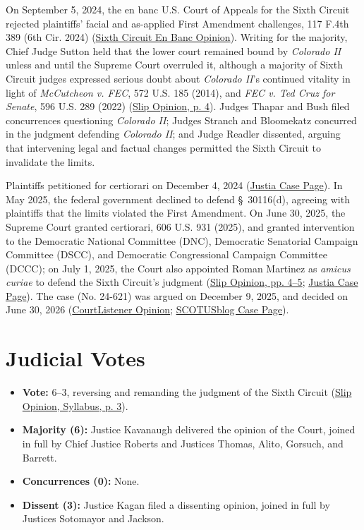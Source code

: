 \documentclass[12pt]{article}
\begin{document}
On September 5, 2024, the en banc U.S. Court of Appeals for the Sixth Circuit rejected plaintiffs' facial and as-applied First Amendment challenges, 117 F.4th 389 (6th Cir. 2024) (\href{https://law.justia.com/cases/federal/appellate-courts/ca6/24-3051/24-3051-2024-09-05.html}{Sixth Circuit En Banc Opinion}). Writing for the majority, Chief Judge Sutton held that the lower court remained bound by \textit{Colorado II} unless and until the Supreme Court overruled it, although a majority of Sixth Circuit judges expressed serious doubt about \textit{Colorado II}'s continued vitality in light of \textit{McCutcheon v. FEC}, 572 U.S. 185 (2014), and \textit{FEC v. Ted Cruz for Senate}, 596 U.S. 289 (2022) (\href{https://www.supremecourt.gov/opinions/25pdf/24-621_h315.pdf}{Slip Opinion, p. 4}). Judges Thapar and Bush filed concurrences questioning \textit{Colorado II}; Judges Stranch and Bloomekatz concurred in the judgment defending \textit{Colorado II}; and Judge Readler dissented, arguing that intervening legal and factual changes permitted the Sixth Circuit to invalidate the limits.

Plaintiffs petitioned for certiorari on December 4, 2024 (\href{https://supreme.justia.com/cases/federal/us/609/24-621/}{Justia Case Page}). In May 2025, the federal government declined to defend \S~30116(d), agreeing with plaintiffs that the limits violated the First Amendment. On June 30, 2025, the Supreme Court granted certiorari, 606 U.S. 931 (2025), and granted intervention to the Democratic National Committee (DNC), Democratic Senatorial Campaign Committee (DSCC), and Democratic Congressional Campaign Committee (DCCC); on July 1, 2025, the Court also appointed Roman Martinez as \textit{amicus curiae} to defend the Sixth Circuit's judgment (\href{https://www.supremecourt.gov/opinions/25pdf/24-621_h315.pdf}{Slip Opinion, pp. 4--5}; \href{https://supreme.justia.com/cases/federal/us/609/24-621/}{Justia Case Page}). The case (No. 24-621) was argued on December 9, 2025, and decided on June 30, 2026 (\href{https://www.courtlistener.com/opinion/10882240/national-republican-senatorial-committee-v-federal-election-commn/}{CourtListener Opinion}; \href{https://www.scotusblog.com/cases/national-republican-senatorial-committee-v-federal-election-commission/}{SCOTUSblog Case Page}).

\section{Judicial Votes}
\begin{itemize}
\item \textbf{Vote:} 6--3, reversing and remanding the judgment of the Sixth Circuit (\href{https://www.supremecourt.gov/opinions/25pdf/24-621_h315.pdf}{Slip Opinion, Syllabus, p. 3}).
\item \textbf{Majority (6):} Justice Kavanaugh delivered the opinion of the Court, joined in full by Chief Justice Roberts and Justices Thomas, Alito, Gorsuch, and Barrett.
\item \textbf{Concurrences (0):} None.
\item \textbf{Dissent (3):} Justice Kagan filed a dissenting opinion, joined in full by Justices Sotomayor and Jackson.
\end{itemize}
\end{document}
